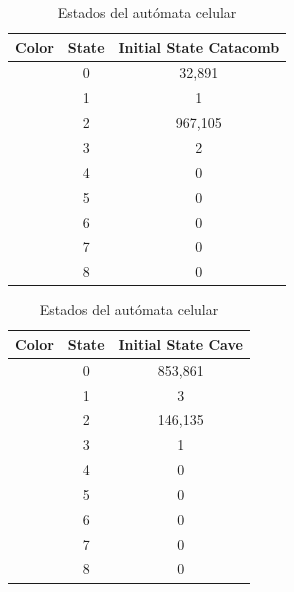     \begin{table}[h]
        \begin{center}
            \begin{tabular}{|c|c|c|}
                \hline
                \textbf{Color}&\textbf{State}&\textbf{Initial State Catacomb} \\
                \hline
                \cellcolor{blue} & 0 & 32,891  \\
                \cellcolor{royalblue} & 1 & 1 \\
                \cellcolor{red} & 2 & 967,105 \\
                \cellcolor{black} & 3 & 2 \\
                \cellcolor{yellow} & 4 & 0 \\
                \cellcolor{darkgreen} & 5 & 0 \\
                \cellcolor{lemon} & 6 & 0 \\
                \cellcolor{darkgray} & 7 & 0 \\
                \cellcolor{green} & 8 & 0 \\
                \hline
            \end{tabular}
        \end{center}
        \caption{Estados del aut\'omata celular}
        \label{tab:estados}
    \end{table}
    \begin{table}[h]
        \begin{center}
            \begin{tabular}{|c|c|c|}
                \hline
                \textbf{Color}&\textbf{State}&\textbf{Initial State Cave} \\
                \hline
                \cellcolor{blue} & 0 & 853,861  \\
                \cellcolor{royalblue} & 1 & 3 \\
                \cellcolor{red} & 2 & 146,135 \\
                \cellcolor{black} & 3 & 1 \\
                \cellcolor{yellow} & 4 & 0 \\
                \cellcolor{darkgreen} & 5 & 0 \\
                \cellcolor{lemon} & 6 & 0 \\
                \cellcolor{darkgray} & 7 & 0 \\
                \cellcolor{green} & 8 & 0 \\
                \hline
            \end{tabular}
        \end{center}
        \caption{Estados del aut\'omata celular}
        \label{tab:estados}
    \end{table}
